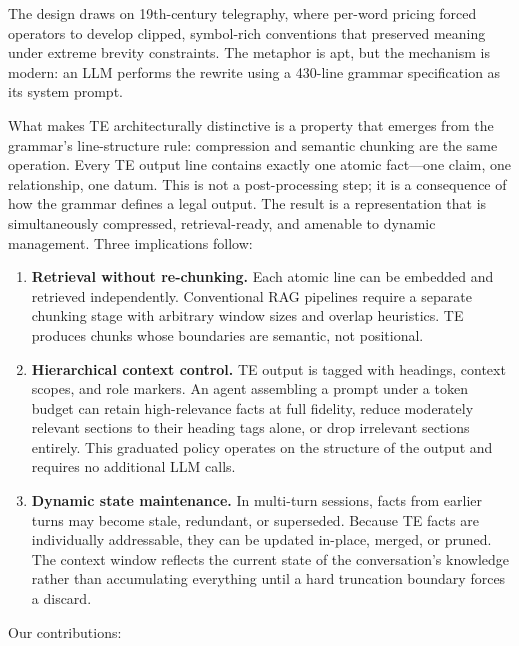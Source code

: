 \documentclass[
]{article}
\begin{document}
The design draws on 19th-century telegraphy, where per-word pricing
forced operators to develop clipped, symbol-rich conventions that
preserved meaning under extreme brevity constraints. The metaphor is
apt, but the mechanism is modern: an LLM performs the rewrite using a
430-line grammar specification as its system prompt.

What makes TE architecturally distinctive is a property that emerges
from the grammar's line-structure rule: compression and semantic
chunking are the same operation. Every TE output line contains exactly
one atomic fact---one claim, one relationship, one datum. This is not a
post-processing step; it is a consequence of how the grammar defines a
legal output. The result is a representation that is simultaneously
compressed, retrieval-ready, and amenable to dynamic management. Three
implications follow:

\begin{enumerate}
\def\labelenumi{\arabic{enumi}.}
\item
  \textbf{Retrieval without re-chunking.} Each atomic line can be
  embedded and retrieved independently. Conventional RAG pipelines
  require a separate chunking stage with arbitrary window sizes and
  overlap heuristics. TE produces chunks whose boundaries are semantic,
  not positional.
\item
  \textbf{Hierarchical context control.} TE output is tagged with
  headings, context scopes, and role markers. An agent assembling a
  prompt under a token budget can retain high-relevance facts at full
  fidelity, reduce moderately relevant sections to their heading tags
  alone, or drop irrelevant sections entirely. This graduated policy
  operates on the structure of the output and requires no additional LLM
  calls.
\item
  \textbf{Dynamic state maintenance.} In multi-turn sessions, facts from
  earlier turns may become stale, redundant, or superseded. Because TE
  facts are individually addressable, they can be updated in-place,
  merged, or pruned. The context window reflects the current state of
  the conversation's knowledge rather than accumulating everything until
  a hard truncation boundary forces a discard.
\end{enumerate}

Our contributions:
\end{document}
